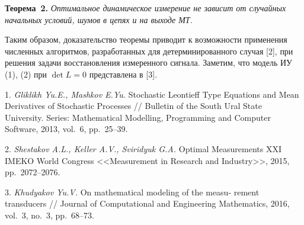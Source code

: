 \textbf{Теорема~2.} {\it
Оптимальное динамическое измерение не зависит от случайных начальных условий, шумов в цепях и на выходе МТ.	
	}
	
Таким образом, доказательство теоремы приводит к возможности применения численных алгоритмов, разработанных для детерминированного случая [2], при решения задачи восстановления измеренного сигнала. Заметим, что модель ИУ (1), (2) при $\det L=0$ представлена в [3].


\litlist

1. {\it Gliklikh Yu.E., Mashkov E.Yu.} Stochastic Leontieff Type Equations and Mean Derivatives of Stochastic Processes // Bulletin of the South Ural State University. Series: Mathematical Modelling, Programming and Computer Software, 2013, vol.~6, pp.~25--39.

2. {\it Shestakov A.L., Keller A.V., Sviridyuk G.A.} Optimal Measurements XXI IMEKO World Congress <<Measurement in Research and Industry>>, 2015, pp.~2072--2076.

3. {\it Khudyakov Yu.V.} On mathematical modeling of the measu- \- rement transducers
// Journal of Computational and Engineering Mathematics, 2016, vol.~3, no.~3, pp.~68--73.
